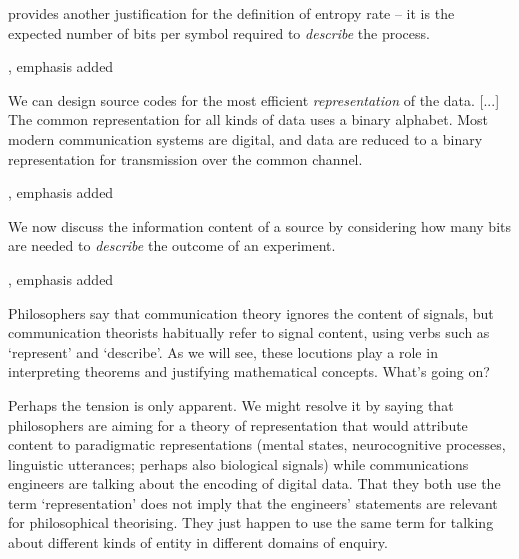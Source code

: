 \documentclass[12pt]{article}
\begin{document}
\begin{myquote}
 provides another justification for the definition of entropy rate -- it is the expected number of bits per symbol required to \textit{describe} the process.
\par\hspace*{\fill}\citet[115]{cover2006elements}, emphasis added
\end{myquote}

\begin{myquote}
We can design source codes for the most efficient \textit{representation} of the data. [...] The common representation for all kinds of data uses a binary alphabet. Most modern communication systems are digital, and data are reduced to a binary representation for transmission over the common channel.
\par\hspace*{\fill}\citet[218]{cover2006elements}, emphasis added
\end{myquote}

\begin{myquote}
We now discuss the information content of a source by considering how many bits are needed to \textit{describe} the outcome of an experiment.
\par\hspace*{\fill}\citet[73]{mackay2003information}, emphasis added
\end{myquote}

\noindent Philosophers say that communication theory ignores the content of signals, but communication theorists habitually refer to signal content, using verbs such as `represent' and `describe'.
As we will see, these locutions play a role in interpreting theorems and justifying mathematical concepts.
What's going on?

Perhaps the tension is only apparent.
We might resolve it by saying that philosophers are aiming for a theory of representation that would attribute content to paradigmatic representations (mental states, neurocognitive processes, linguistic utterances; perhaps also biological signals) while communications engineers are talking about the encoding of digital data.
That they both use the term `representation' does not imply that the engineers' statements are relevant for philosophical theorising.
They just happen to use the same term for talking about different kinds of entity in different domains of enquiry.
\end{document}
